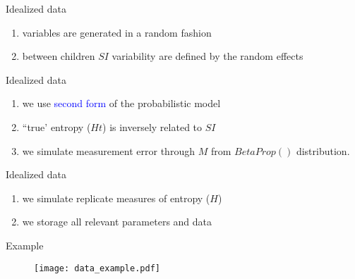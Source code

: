%
%
\begin{lhframe}[rhgraphic={\texttt{[image: sim\_code2.png]}}]
	{Idealized data}
	
	\begin{enumerate}
		\item variables are generated in a random fashion 
		\item between children $SI$ variability are defined by the random effects
	\end{enumerate}
\end{lhframe}
%
%
\begin{lhframe}[rhgraphic={\texttt{[image: sim\_code3.png]}}]
	{Idealized data}
	
	\begin{enumerate}
		\item we use \textcolor{blue}{second form} of the probabilistic model
		\item ``true' entropy ($Ht$) is inversely related to $SI$
		\item we simulate measurement error through $M$ from $BetaProp()$ distribution.
	\end{enumerate}
\end{lhframe}
%
%
\begin{lhframe}[rhgraphic={\texttt{[image: sim\_code4.png]}}]
	{Idealized data}
	
	\begin{enumerate}
		\item we simulate replicate measures of entropy ($H$)
		\item we storage all relevant parameters and data
	\end{enumerate}
\end{lhframe}
%
%
\begin{frame}
	{Example}
	\begin{figure}
		\texttt{[image: data\_example.pdf]}
	\end{figure}
\end{frame}
%
%